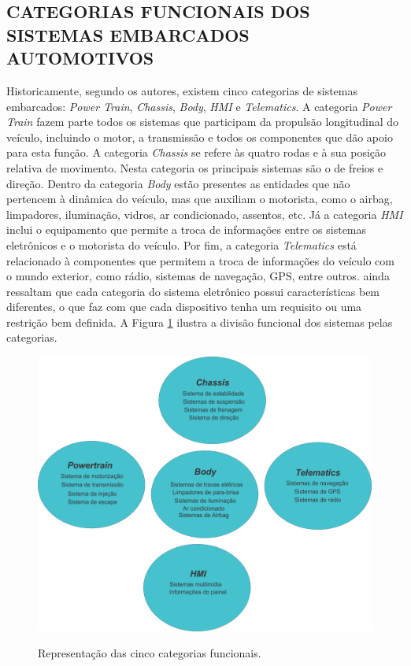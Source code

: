\subsection{CATEGORIAS FUNCIONAIS DOS SISTEMAS EMBARCADOS AUTOMOTIVOS}
Historicamente, segundo os autores, existem cinco categorias de sistemas embarcados: \textit{Power Train}, \textit{Chassis}, \textit{Body}, \textit{HMI} e \textit{Telematics}. A categoria \textit{Power Train} fazem parte todos os sistemas que participam da propulsão longitudinal do veículo, incluindo o motor, a transmissão e todos os componentes que dão apoio para esta função. A categoria \textit{Chassis} se refere às quatro rodas e à sua posição relativa de movimento. Nesta categoria os principais sistemas são o de freios e direção. Dentro da categoria \textit{Body} estão presentes as entidades que não pertencem à dinâmica do veículo, mas que auxiliam o motorista, como o airbag, limpadores, iluminação, vidros, ar condicionado, assentos, etc. Já a categoria \textit{HMI} inclui o equipamento que permite a troca de informações entre os sistemas eletrônicos e o motorista do veículo. Por fim, a categoria \textit{Telematics} está relacionado à componentes que permitem a troca de informações do veículo com o mundo exterior, como rádio, sistemas de navegação, GPS, entre outros.  ainda ressaltam que cada categoria do sistema eletrônico possui características bem diferentes, o que faz com que cada dispositivo tenha um requisito ou uma restrição bem definida. A Figura \ref{Fig:categorias_sistemas_embarcados} ilustra a divisão funcional dos sistemas pelas categorias.

\begin{figure}[!ht]
\centering
\caption{Representação das cinco categorias funcionais.} 
{\includegraphics[scale=.31]{imagens/categoriaFuncionalSistemasEmbarcados.png}}\\
 \label{Fig:categorias_sistemas_embarcados}
\end{figure}


